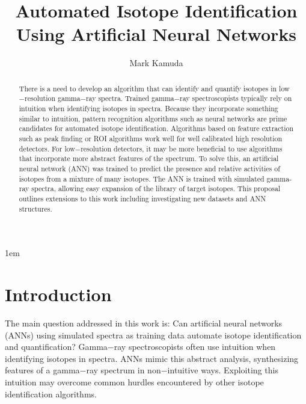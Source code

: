 \documentclass[tocnosub,noragright,centerchapter,12pt,fullpage]{uiucecethesis09}
\title{Automated Isotope Identification Using Artificial Neural Networks}
\author{Mark Kamuda}
\begin{document}
%

%
\maketitle

\parindent 1em%

\frontmatter


\begin{abstract}


There is a need to develop an algorithm that can identify and quantify isotopes in low$-$resolution gamma$-$ray spectra. Trained gamma$-$ray spectroscopists typically rely on intuition when identifying isotopes in spectra. Because they incorporate something similar to intuition, pattern recognition algorithms such as neural networks are prime candidates for automated isotope identification. Algorithms based on feature extraction such as peak finding or ROI algorithms work well for well calibrated high resolution detectors. For low$-$resolution detectors, it may be more beneficial to use algorithms that incorporate more abstract features of the spectrum. To solve this, an artificial neural network (ANN) was trained to predict the presence and relative activities of isotopes from a mixture of many isotopes. The ANN is trained with simulated gamma-ray spectra, allowing easy expansion of the library of target isotopes. This proposal outlines extensions to this work including investigating new datasets and ANN structures.

\end{abstract}

\tableofcontents

\listoftables

\listoffigures

\mainmatter


\chapter{Introduction}

The main question addressed in this work is: Can artificial neural networks (ANNs) using simulated spectra as training data automate isotope identification and quantification? Gamma$-$ray spectroscopists often use intuition when identifying isotopes in spectra. ANNs mimic this abstract analysis, synthesizing features of a gamma$-$ray spectrum in non$-$intuitive ways. Exploiting this intuition may overcome common hurdles encountered by other isotope identification algorithms. 
\end{document}
